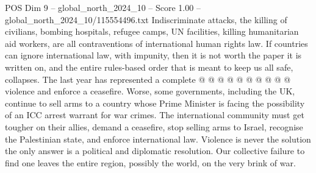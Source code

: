 \begin{textsample}{POS Dim 9 – global\_north\_2024\_10 – Score 1.00 – global\_north\_2024\_10/115554496.txt}
Indiscriminate attacks, the killing of civilians, bombing hospitals, refugee camps, UN facilities, killing humanitarian aid workers, are all contraventions of international human rights law.
If countries can ignore international law, with impunity, then it is not worth the paper it is written on, and the entire rules-based order that is meant to keep us all safe, collapses.
The last year has represented a complete @ @ @ @ @ @ @ @ @ @ violence and enforce a ceasefire.
Worse, some governments, including the UK, continue to sell arms to a country whose Prime Minister is facing the possibility of an ICC arrest warrant for war crimes.
The international community must get tougher on their allies, demand a ceasefire, stop selling arms to Israel, recognise the Palestinian state, and enforce international law.
Violence is never the solution the only answer is a political and diplomatic resolution.
Our collective failure to find one leaves the entire region, possibly the world, on the very brink of war.

\end{textsample}
